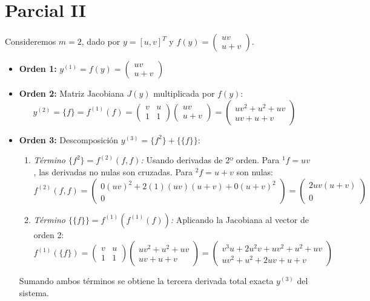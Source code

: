 \section{Parcial II}
\begin{ejer}
    [5.5.1(ii)] Consideremos $m = 2$, dado por $y = [u, v]^T$ y $f(y) = \left(\begin{smallmatrix} uv \\ u + v \end{smallmatrix} \right)$.
\end{ejer}
\begin{sol}
    \begin{itemize}
    \item \textbf{Orden 1:} $y^{(1)} = f(y) = \begin{pmatrix} uv \\ u + v \end{pmatrix}$
    \item \textbf{Orden 2:} Matriz Jacobiana $J(y)$ multiplicada por $f(y)$:
    \[
    y^{(2)} = \{f\} = f^{(1)}(f) = \begin{pmatrix} v & u \\ 1 & 1 \end{pmatrix} \begin{pmatrix} uv \\ u + v \end{pmatrix} = \begin{pmatrix} uv^2 + u^2 + uv \\ uv + u + v \end{pmatrix}
    \]
    \item \textbf{Orden 3:} Descomposición $y^{(3)} = \{f^2\} + \{\{f\}\}$:
    \begin{enumerate}
        \item \textit{Término $\{f^2\} = f^{(2)}(f, f)$:} Usando derivadas de 2º orden. Para $\!^1 f=uv$, las derivadas no nulas son cruzadas. Para $\!^2 f=u+v$ son nulas:
        \[
        f^{(2)}(f, f) = \begin{pmatrix} 0(uv)^2 + 2(1)(uv)(u+v) + 0(u+v)^2 \\ 0 \end{pmatrix} = \begin{pmatrix} 2uv(u+v) \\ 0 \end{pmatrix}
        \]
        \item \textit{Término $\{\{f\}\} = f^{(1)}(f^{(1)}(f))$:} Aplicando la Jacobiana al vector de orden 2:
        \[
        f^{(1)}(\{f\}) = \begin{pmatrix} v & u \\ 1 & 1 \end{pmatrix} \begin{pmatrix} uv^2 + u^2 + uv \\ uv + u + v \end{pmatrix} = \begin{pmatrix} v^3u + 2u^2v + uv^2 + u^2 + uv \\ uv^2 + u^2 + 2uv + u + v \end{pmatrix}
        \]
    \end{enumerate}
    Sumando ambos términos se obtiene la tercera derivada total exacta $y^{(3)}$ del sistema.
\end{itemize}
\end{sol}

